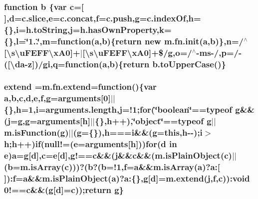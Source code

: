 \subsubsection[{b}]{\setlength{\rightskip}{0pt plus 5cm}function b \{var {\bf c}=\mbox{[}$\,$\mbox{]},{\bf d}=c.\+slice,{\bf e}=c.\+concat,f=c.\+push,g=c.\+index\+Of,h=\{\},i=h.\+to\+String,j=h.\+has\+Own\+Property,k=\{\},l=\char`\"{}1..\char`\"{},m=function({\bf a},b)\{return new m.\+fn.\+init({\bf a},b)\},{\bf n}=/$^\wedge$\mbox{[}\textbackslash{}s\textbackslash{}u\+F\+E\+F\+F\textbackslash{}x\+A0\mbox{]}+$\vert$\mbox{[}\textbackslash{}s\textbackslash{}u\+F\+E\+F\+F\textbackslash{}x\+A0\mbox{]}+\$/g,o=/$^\wedge$-\/ms-\//,p=/-\/(\mbox{[}\textbackslash{}da-\/z\mbox{]})/gi,q=function({\bf a},b)\{return b.\+to\+Upper\+Case()\}}\label{jquery-1_811_82_8min_8js_ac0431efac4d7c393d1e70b86115cb93f}
\hypertarget{jquery-1_811_82_8min_8js_a97d2dfc7eacd4130836f6cf8b6766d1e}{}
\subsubsection[{extend}]{\setlength{\rightskip}{0pt plus 5cm}extend =m.\+fn.\+extend=function()\{var {\bf a},{\bf b},{\bf c},{\bf d},{\bf e},f,g=arguments\mbox{[}0\mbox{]}$\vert$$\vert$\{\},h=1,i=arguments.\+length,j=!1;{\bf for}(\char`\"{}boolean\char`\"{}==typeof g\&\&(j=g,g=arguments\mbox{[}h\mbox{]}$\vert$$\vert$\{\},h++),\char`\"{}object\char`\"{}==typeof g$\vert$$\vert$m.\+is\+Function(g)$\vert$$\vert$(g=\{\}),h===i\&\&(g=this,h-\/-\/);i$>$h;h++){\bf if}(null!=({\bf e}=arguments\mbox{[}h\mbox{]})){\bf for}({\bf d} in {\bf e}){\bf a}=g\mbox{[}{\bf d}\mbox{]},{\bf c}={\bf e}\mbox{[}{\bf d}\mbox{]},g!=={\bf c}\&\&(j\&\&{\bf c}\&\&(m.\+is\+Plain\+Object({\bf c})$\vert$$\vert$({\bf b}=m.\+is\+Array({\bf c})))?({\bf b}?({\bf b}=!1,f={\bf a}\&\&m.\+is\+Array({\bf a})?a\+:\mbox{[}$\,$\mbox{]})\+:f={\bf a}\&\&m.\+is\+Plain\+Object({\bf a})?a\+:\{\},g\mbox{[}{\bf d}\mbox{]}=m.\+extend(j,f,{\bf c}))\+:void 0!=={\bf c}\&\&(g\mbox{[}{\bf d}\mbox{]}={\bf c}));return g\}}\label{jquery-1_811_82_8min_8js_a97d2dfc7eacd4130836f6cf8b6766d1e}
\hypertarget{jquery-1_811_82_8min_8js_ab2836ee14921cbd6e34ea91a9a99ad66}{}
